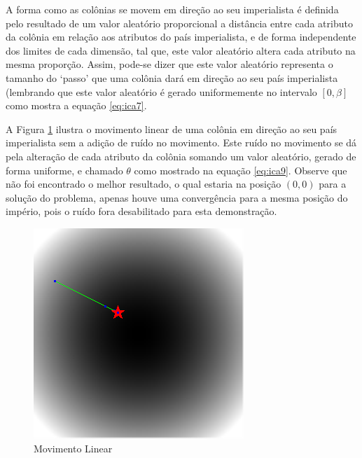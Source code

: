 A forma como as colônias se movem em direção ao seu imperialista é definida pelo resultado de um valor aleatório proporcional a distância entre cada atributo da colônia em relação aos atributos do país imperialista, e de forma independente dos limites de cada dimensão, tal que, este valor aleatório altera cada atributo na mesma proporção. Assim, pode-se dizer que este valor aleatório representa o tamanho do ‘passo’ que uma colônia dará em direção ao seu país imperialista (lembrando que este valor aleatório é gerado uniformemente no intervalo \(\left[0,\beta\right]\) como mostra a equação \ref{eq:ica7}.


A Figura \ref{fig:Movimento_Linear} ilustra o movimento linear de uma colônia em direção ao seu país imperialista sem a adição de ruído no movimento. Este ruído no movimento se dá pela alteração de cada atributo da colônia somando um valor aleatório, gerado de forma uniforme, e chamado \(\theta\) como mostrado na equação \ref{eq:ica9}. Observe que não foi encontrado o melhor resultado, o qual estaria na posição \((0,0)\) para a solução do problema, apenas houve uma convergência para a mesma posição do império, pois o ruído fora desabilitado para esta demonstração.

\begin{figure}[h]
	\centering
	\includegraphics[scale=1]{Figuras/Movimento_Linear.png}
	\caption{Movimento Linear }
	\label{fig:Movimento_Linear}
\end{figure}

